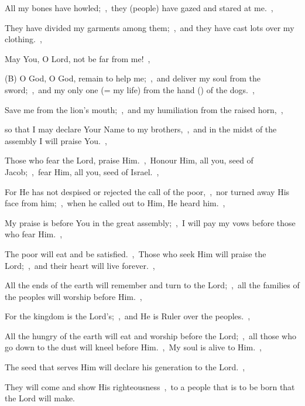 \documentclass[12pt,twoside,a5paper]{article}
\begin{document}
\begin{normalparskip}
  All my bones have howled;~\sep\ they (people) have gazed and stared at me.~\sep

  They have divided my garments among them;~\sep\ and they have cast lots over my clothing.~\sep

  May You, O Lord, not be far from me!~\sep

  (B) O God, O God, remain to help me;~\sep\ and deliver my soul from the sword;~\sep\ and my only one (= my life) from the hand () of the dogs.~\sep

  Save me from the lion's mouth;~\sep\ and my humiliation from the raised horn,~\sep

  so that I may declare Your Name to my brothers,~\sep\ and in the midst of the assembly I will praise You.~\sep

  Those who fear the Lord, praise Him.~\sep\ Honour Him, all you, seed of Jacob;~\sep\ fear Him, all you, seed of Israel.~\sep

  For He has not despised or rejected the call of the poor,~\sep\ nor turned away His face from him;~\sep\ when he called out to Him, He heard him.~\sep

  My praise is before You in the great assembly;~\sep\ I will pay my vows before those who fear Him.~\sep

  The poor will eat and be satisfied.~\sep\ Those who seek Him will praise the Lord;~\sep\ and their heart will live forever.~\sep

  All the ends of the earth will remember and turn to the Lord;~\sep\ all the families of the peoples will worship before Him.~\sep

  For the kingdom is the Lord's;~\sep\ and He is Ruler over the peoples.~\sep

  All the hungry of the earth will eat and worship before the Lord;~\sep\ all those who go down to the dust will kneel before Him.~\sep\ My soul is alive to Him.~\sep

  The seed that serves Him will declare his generation to the Lord.~\sep

  They will come and show His righteousness~\sep\ to a people that is to be born that the Lord will make.
\end{normalparskip}

\end{document}
